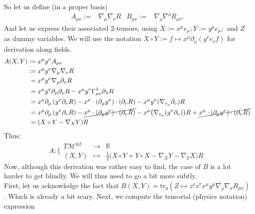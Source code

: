 \documentclass[a4paper,11pt]{article}
\numberwithin{equation}{section}
\theoremstyle{definition}
\begin{document}
\noindent So let us define (in a proper basis)
\begin{align}
    A_{\mu\nu} :=& \nabla_\mu\nabla_\nu R&
    B_{\mu\nu} :=& \nabla_\rho\nabla^\rho R_{\mu\nu}.
\end{align}
And let us express their associated 2-tensors, using $X:=x^\mu e_\mu; Y:=y^\mu e_\mu;$ and $Z$ as dummy variables. We will use the notation $X\circ Y:= f \mapsto x^\mu \partial_\mu (y^\nu e_\nu f)$ for derivation along fields.
\begin{align}
    A(X,Y) :\!\!&= x^\mu y^\nu A_{\mu\nu}\notag\\
    :\!\!&= x^\mu y^\nu \nabla_\mu \nabla_\nu R\notag\\
    &= x^\mu y^\nu \nabla_\mu \partial_\nu R\notag\\
    &= x^\mu y^\nu \partial_\mu \partial_\nu R - x^\mu y^\nu \Gamma_{\mu\nu}^\lambda \partial_\lambda R\notag\\
    &= x^\mu \partial_\mu \left(y^\nu \partial_\nu R \right) - x^\mu \cdot(\partial_\mu y^\nu) \cdot (\partial_\nu R) - x^\mu y^\nu (\nabla_{e_\mu} \partial_\nu)R\notag\\
    &= x^\mu \partial_\mu \left(y^\nu \partial_\nu R \right) - \cancel{x^\mu \cdot(\partial_\mu y^\nu) \cdot (\partial_\nu R)} - x^\mu \big(\nabla_{e_\mu} (y^\nu \partial_\nu)\big)R + \cancel{x^\mu \cdot (\partial_\mu y^\nu) \cdot (\partial_\nu R)}\notag\\
    &= (X\circ Y - \nabla_X Y) R
\end{align}
Thus:
\begin{equation}
    A : \Bigg\{\begin{matrix}
        T\mathcal{M}^{\otimes 2} & \to & \mathbb{R}\\
        (X,Y) & \mapsto & \frac{1}{2}\big(X\circ Y + Y\circ X - \nabla_X Y - \nabla_Y X\big) R
    \end{matrix}
\end{equation}
Now, although this derivation was rather easy to find, the case of $B$ is a lot harder to get blindly. We will thus need to go a bit more subtly.
\\
First, let us acknowledge the fact that $B(X,Y)=\mathrm{tr}_g(Z\mapsto z^\rho z^\sigma x^\mu y^\mu \nabla_\rho \nabla_\sigma R_{\mu\nu})$. Which is already a bit scary. Next, we compute the tensorial (physics notation) expression
\end{document}
